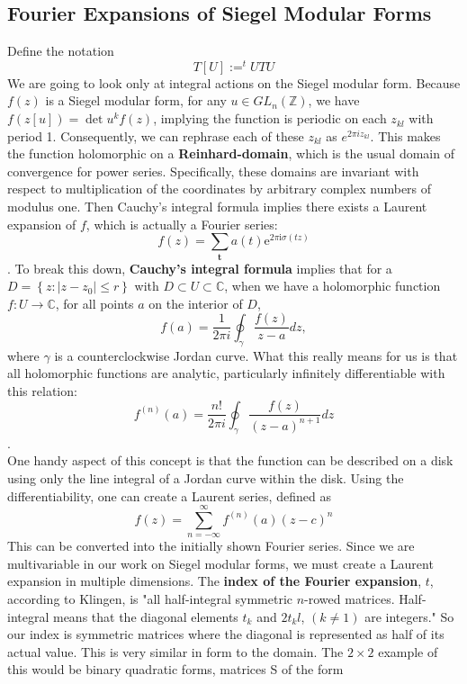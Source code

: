 \documentclass[11pt, oneside]{amsart}
\begin{document}
\subsection{Fourier Expansions of Siegel Modular Forms}
Define the notation $$T[U]:= ^{t}UTU$$ We are going to look only at integral actions on the Siegel modular form. Because $f(z)$ is a Siegel modular form, for any $u\in GL_n(\mathbb{Z})$, we have $f(z[u])=\operatorname{det} u^{k} f(z)$, implying the function is periodic on each $z_{kl}$ with period 1. Consequently, we can rephrase each of these $z_{kl}$ as $e^{2\pi i z_{kl}}$. This makes the function holomorphic on a \textbf{Reinhard-domain}, which is the usual domain of convergence for power series. Specifically, these domains are invariant with respect to multiplication of the coordinates by arbitrary complex numbers of modulus one. Then Cauchy's integral formula implies there exists a Laurent expansion of $f$, which is actually a Fourier series: $$f(z)=\sum_{\mathbf{t}} a(t) \mathrm{e}^{2 \pi \mathrm{i} \sigma(t z)}$$. To break this down, \textbf{Cauchy's integral formula} implies that for a $D=\left\{z :\left|z-z_{0}\right| \leq r\right\}$ with $D \subset U \subset \mathbb{C}$, when we have a holomorphic function $f:U\rightarrow \mathbb{C}$, for all points $a$ on the interior of $D$, $$f(a)=\frac{1}{2 \pi i} \oint_{\gamma} \frac{f(z)}{z-a} d z,$$
where $\gamma$ is a counterclockwise Jordan curve. What this really means for us is that all holomorphic functions are analytic, particularly infinitely differentiable with this relation: $$f^{(n)}(a)=\frac{n !}{2 \pi i} \oint_{\gamma} \frac{f(z)}{(z-a)^{n+1}} d z$$.\\
One handy aspect of this concept is that the function can be described on a disk using only the line integral of a Jordan curve within the disk. Using the differentiability, one can create a Laurent series, defined as $$f(z)=\sum_{n=-\infty}^{\infty} f^{(n)}(a)(z-c)^{n}$$ This can be converted into the initially shown Fourier series. Since we are multivariable in our work on Siegel modular forms, we must create a Laurent expansion in multiple dimensions. The \textbf{index of the Fourier expansion}, $t$, according to Klingen, is "all half-integral symmetric $n$-rowed matrices. Half-integral means that the diagonal elements $t_k$ and $2t_kl$, $(k\neq 1)$ are integers." So our index is symmetric matrices where the diagonal is represented as half of its actual value. This is very similar in form to the domain. The $2\times 2$ example of this would be binary quadratic forms, matrices S of the form
\end{document}
